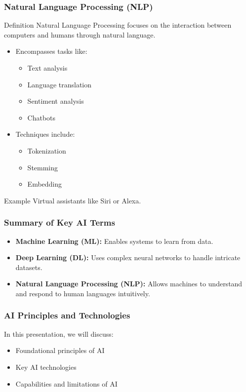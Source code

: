 \documentclass{beamer}
\begin{document}
\begin{frame}[fragile]
    \frametitle{Natural Language Processing (NLP)}
    \begin{block}{Definition}
        Natural Language Processing focuses on the interaction between computers and humans through natural language.
    \end{block}

    \begin{itemize}
        \item Encompasses tasks like:
        \begin{itemize}
            \item Text analysis
            \item Language translation
            \item Sentiment analysis
            \item Chatbots
        \end{itemize}
        \item Techniques include:
        \begin{itemize}
            \item Tokenization
            \item Stemming
            \item Embedding
        \end{itemize}
    \end{itemize}

    \begin{block}{Example}
        Virtual assistants like Siri or Alexa.
    \end{block}
\end{frame}

\begin{frame}[fragile]
    \frametitle{Summary of Key AI Terms}
    \begin{itemize}
        \item \textbf{Machine Learning (ML):} Enables systems to learn from data.
        \item \textbf{Deep Learning (DL):} Uses complex neural networks to handle intricate datasets.
        \item \textbf{Natural Language Processing (NLP):} Allows machines to understand and respond to human languages intuitively.
    \end{itemize}
\end{frame}

\begin{frame}[fragile]
    \frametitle{AI Principles and Technologies}
    In this presentation, we will discuss:
    \begin{itemize}
        \item Foundational principles of AI
        \item Key AI technologies
        \item Capabilities and limitations of AI
    \end{itemize}
\end{frame}
\end{document}
